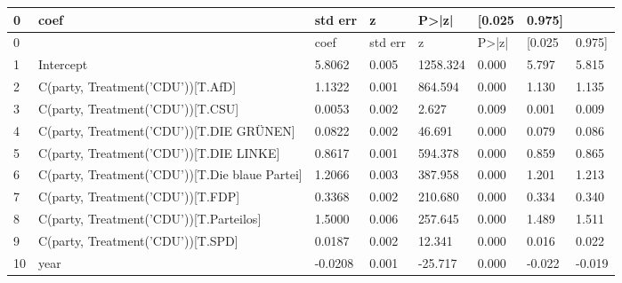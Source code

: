 \begin{tabular}{llllllll}
\toprule
0 &     coef    &  std err   &     z      &  P>|z|  &   [0.025   &   0.975]   \\
\midrule
0  &                                                 &        coef &    std err &          z &   P>|z| &     [0.025 &     0.975] \\
1  &                                       Intercept &      5.8062 &      0.005 &   1258.324 &   0.000 &      5.797 &      5.815 \\
2  &               C(party, Treatment('CDU'))[T.AfD] &      1.1322 &      0.001 &    864.594 &   0.000 &      1.130 &      1.135 \\
3  &               C(party, Treatment('CDU'))[T.CSU] &      0.0053 &      0.002 &      2.627 &   0.009 &      0.001 &      0.009 \\
4  &        C(party, Treatment('CDU'))[T.DIE GRÜNEN] &      0.0822 &      0.002 &     46.691 &   0.000 &      0.079 &      0.086 \\
5  &         C(party, Treatment('CDU'))[T.DIE LINKE] &      0.8617 &      0.001 &    594.378 &   0.000 &      0.859 &      0.865 \\
6  &  C(party, Treatment('CDU'))[T.Die blaue Partei] &      1.2066 &      0.003 &    387.958 &   0.000 &      1.201 &      1.213 \\
7  &               C(party, Treatment('CDU'))[T.FDP] &      0.3368 &      0.002 &    210.680 &   0.000 &      0.334 &      0.340 \\
8  &         C(party, Treatment('CDU'))[T.Parteilos] &      1.5000 &      0.006 &    257.645 &   0.000 &      1.489 &      1.511 \\
9  &               C(party, Treatment('CDU'))[T.SPD] &      0.0187 &      0.002 &     12.341 &   0.000 &      0.016 &      0.022 \\
10 &                                            year &     -0.0208 &      0.001 &    -25.717 &   0.000 &     -0.022 &     -0.019 \\
\bottomrule
\end{tabular}
